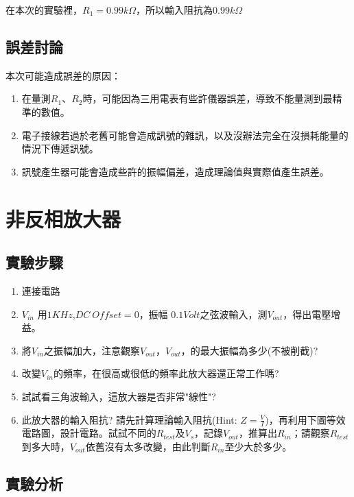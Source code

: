 \documentclass[12pt,a4paper]{article}
\begin{document}
\begin{CJK}{UTF8}{bkai}
\begin{enumerate}
在本次的實驗裡，$R_1=0.99k\Omega$，所以輸入阻抗為$0.99k\Omega$
    
\end{enumerate}



\subsection{誤差討論}

\noindent 本次可能造成誤差的原因：
\begin{enumerate}
    \item 在量測$R_1$、$R_2$時，可能因為三用電表有些許儀器誤差，導致不能量測到最精準的數值。
    \item 電子接線若過於老舊可能會造成訊號的雜訊，以及沒辦法完全在沒損耗能量的情況下傳遞訊號。
    \item 訊號產生器可能會造成些許的振幅偏差，造成理論值與實際值產生誤差。
\end{enumerate}



\section{非反相放大器}

\subsection{實驗步驟}
\begin{enumerate}
    \item 連接電路
    \item $V_{in}$ 用$1KHz$,$DC\ Offset=0$，振幅 $0.1Volt$之弦波輸入，測$V_{out}$，得出電壓增益。
    \item 將$V_{in}$之振幅加大，注意觀察$V_{out}$，$V_{out}$，的最大振幅為多少(不被削截)?
    \item 改變$V_{in}$的頻率，在很高或很低的頻率此放大器還正常工作嗎?
    \item 試試看三角波輸入，這放大器是否非常"線性"?
    \item 此放大器的輸入阻抗? 請先計算理論輸入阻抗(Hint: $Z=\frac{V}{I}$)，再利用下圖等效電路圖，設計電路。試試不同的$ R_{test} $及$ V_s$，記錄$V_{out}$，推算出$R_{in}$；請觀察$ R_{test} $到多大時，$V_{out}$依舊沒有太多改變，由此判斷$ R_{in} $至少大於多少。
\end{enumerate}

\clearpage
\subsection{實驗分析}



\end{CJK}
\end{document}
